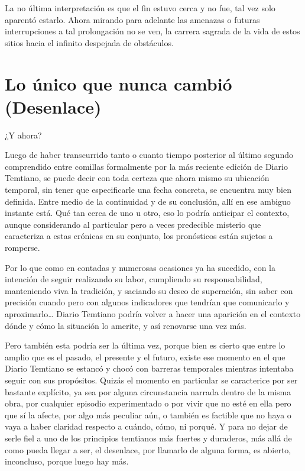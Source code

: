 \documentclass[
  spanish,
]{book}
\begin{document}
La no última interpretación es que el fin estuvo cerca y no fue, tal vez solo aparentó estarlo. Ahora mirando para adelante las amenazas o futuras interrupciones a tal prolongación no se ven, la carrera sagrada de la vida de estos sitios hacia el infinito despejada de obstáculos.

\hypertarget{lo-uxfanico-que-nunca-cambiuxf3-desenlace}{%
\chapter{Lo único que nunca cambió (Desenlace)}\label{lo-uxfanico-que-nunca-cambiuxf3-desenlace}}

¿Y ahora?

Luego de haber transcurrido tanto o cuanto tiempo posterior al último segundo comprendido entre comillas formalmente por la más reciente edición de Diario Temtiano, se puede decir con toda certeza que ahora mismo su ubicación temporal, sin tener que especificarle una fecha concreta, se encuentra muy bien definida. Entre medio de la continuidad y de su conclusión, allí en ese ambiguo instante está. Qué tan cerca de uno u otro, eso lo podría anticipar el contexto, aunque considerando al particular pero a veces predecible misterio que caracteriza a estas crónicas en su conjunto, los pronósticos están sujetos a romperse.

Por lo que como en contadas y numerosas ocasiones ya ha sucedido, con la intención de seguir realizando su labor, cumpliendo su responsabilidad, manteniendo viva la tradición, y saciando su deseo de superación, sin saber con precisión cuando pero con algunos indicadores que tendrían que comunicarlo y aproximarlo\ldots{} Diario Temtiano podría volver a hacer una aparición en el contexto dónde y cómo la situación lo amerite, y así renovarse una vez más.

Pero también esta podría ser la última vez, porque bien es cierto que entre lo amplio que es el pasado, el presente y el futuro, existe ese momento en el que Diario Temtiano se estancó y chocó con barreras temporales mientras intentaba seguir con sus propósitos. Quizás el momento en particular se caracterice por ser bastante explícito, ya sea por alguna circunstancia narrada dentro de la misma obra, por cualquier episodio experimentado o por vivir que no esté en ella pero que sí la afecte, por algo más peculiar aún, o también es factible que no haya o vaya a haber claridad respecto a cuándo, cómo, ni porqué. Y para no dejar de serle fiel a uno de los principios temtianos más fuertes y duraderos, más allá de como pueda llegar a ser, el desenlace, por llamarlo de alguna forma, es abierto, inconcluso, porque luego hay más.
\end{document}
